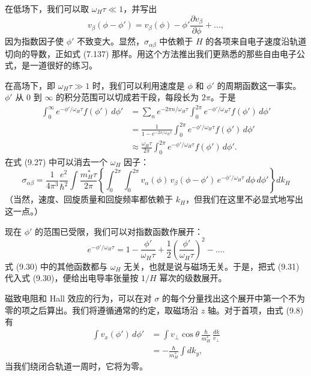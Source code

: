 在低场下，我们可以取 $\omega_H\tau\ll 1$，并写出
\begin{equation*}
v_{\beta}(\phi-\phi')=v_{\beta}(\phi)-\phi'\frac{\partial v_{\beta}}{\partial\phi}+\dots, \tag{9.28}
\end{equation*}
因为指数因子使 $\phi'$ 不致变大。显然，$\sigma_{\alpha\beta}$ 中依赖于 $H$ 的各项来自电子速度沿轨道切向的导数，正如式 (7.137) 那样。用这个方法推出我们更熟悉的那些自由电子公式，是一道很好的练习。

在高场下，即 $\omega_H\tau\gg 1$ 时，我们可以利用速度是 $\phi$ 和 $\phi'$ 的周期函数这一事实。$\phi'$ 从 0 到 $\infty$ 的积分范围可以切成若干段，每段长为 $2\pi$。于是
\begin{align*}
\int_{0}^{\infty}e^{-\phi'/\omega_H\tau}f(\phi')\,d\phi'&=\sum_{n}e^{-2\pi n/\omega_H\tau}\int_{0}^{2\pi}e^{-\phi'/\omega_H\tau}f(\phi')\,d\phi'\\
&=\frac{1}{1-e^{-2\pi/\omega_H\tau}}\int_{0}^{2\pi}e^{-\phi'/\omega_H\tau}f(\phi')\,d\phi'\\
&\approx\frac{\omega_H\tau}{2\pi}\int_{0}^{2\pi}e^{-\phi'/\omega_H\tau}f(\phi')\,d\phi'. \tag{9.29}
\end{align*}
在式 (9.27) 中可以消去一个 $\omega_H$ 因子：
\begin{equation*}
\sigma_{\alpha\beta}=\frac{1}{4\pi^{3}}\frac{e^{2}}{\hbar^{2}}\int\frac{m_H^{*}\tau}{2\pi}\left\{\int_{0}^{2\pi}\int_{0}^{2\pi}v_{\alpha}(\phi)\,v_{\beta}(\phi-\phi')\,e^{-\phi'/\omega_H\tau}\,d\phi\,d\phi'\right\}dk_H \tag{9.30}
\end{equation*}
（当然，速度、回旋质量和回旋频率都依赖于 $k_H$，但我们在这里不必显式地写出这一点。）

现在 $\phi'$ 的范围已受限，我们可以对指数函数作展开：
\begin{equation*}
e^{-\phi'/\omega_H\tau}=1-\frac{\phi'}{\omega_H\tau}+\frac{1}{2}\left(\frac{\phi'}{\omega_H\tau}\right)^{2}-\dots. \tag{9.31}
\end{equation*}
式 (9.30) 中的其他函数都与 $\omega_H$ 无关，也就是说与磁场无关。于是，把式 (9.31) 代入式 (9.30)，便给出电导率张量按 $1/H$ 幂次的级数展开。

磁致电阻和 Hall 效应的行为，可以在对 $\sigma$ 的每个分量找出这个展开中第一个不为零的项之后算出。我们将遵循通常的约定，取磁场沿 $z$ 轴。对于首项，由式 (9.8) 有
\begin{align*}
\int v_{x}(\phi')\,d\phi'&=\int v_{\perp}\cos\theta\,\frac{\hbar}{m_H^{*}}\,\frac{dk}{v_{\perp}}\\
&=-\frac{\hbar}{m_H^{*}}\int dk_{y}, \tag{9.32}
\end{align*}
当我们绕闭合轨道一周时，它将为零。

